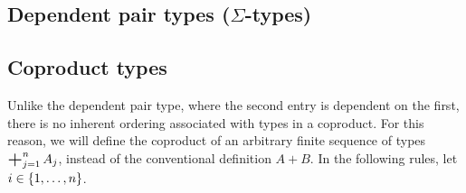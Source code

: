 \documentclass[UKenglish, 11pt, a4paper, parskip=half]{scrbook}
\DeclareMathOperator*{\bigplus}{\scalerel*{+}{\textstyle\sum}}
\begin{document}
\subsection{Dependent pair types (\texorpdfstring{$\Sigma$}{Σ}-types)}

\subsection{Coproduct types}

Unlike the dependent pair type, where the second entry is dependent on the first, there is no inherent ordering associated with types in a coproduct.
For this reason, we will define the coproduct of an arbitrary finite sequence of types \( \bigplus_{j=1}^n A_j \), instead of the conventional definition \( A + B \).
In the following rules, let \( i \in \qty{1, \dots, n} \).
\end{document}
